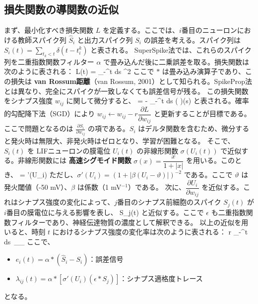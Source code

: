 \subsection{損失関数の導関数の近似}
まず、最小化すべき損失関数 $L$ を定義する。ここでは、$i$番目のニューロンにおける教師スパイク列 $\hat{S}_i$ と出力スパイク列 $S_i$ の誤差を考える。スパイク列は $S_i(t) = \sum_{t_k < t} \delta(t - t_i^k)$ と表される。
SuperSpike法では、これらのスパイク列を二重指数関数フィルター $\alpha$ で畳み込んだ後に二乗誤差を取る。損失関数は次のように表される：
L(t) =  \int_{-\infty}^{t} ds ^2
ここで $*$ は畳み込み演算子であり、この損失は \textbf{van Rossum距離}（van Rossum, 2001）として知られる。SpikeProp法とは異なり、完全にスパイクが一致しなくても誤差信号が残る。
この損失関数をシナプス強度 $w_{ij}$ に関して微分すると、
 = - \int_{-\infty}^{t} ds  \left( \alpha *  \right)(s)
と表される。確率的勾配降下法（SGD）により $w_{ij} \leftarrow w_{ij} - r \dfrac{\partial L}{\partial w_{ij}}$ と更新することが目標である。
ここで問題となるのは $\frac{\partial S_i}{\partial w_{ij}}$ の項である。$S_i$ はデルタ関数を含むため、微分すると発火時は無限大、非発火時はゼロとなり、学習が困難となる。
そこで、$S_i(t)$ を LIFニューロンの膜電位 $U_i(t)$ の非線形関数 $\sigma(U_i(t))$ で近似する。非線形関数には \textbf{高速シグモイド関数} $\sigma(x) = \dfrac{x}{1 + |x|}$ を用いる。このとき、
 \approx {} = \sigma'(U_i) \cdot {}
ただし、$\sigma'(U_i) = (1 + |\beta(U_i - \vartheta)|)^{-2}$ である。ここで $\vartheta$ は発火閾値（-50 mV）、$\beta$ は係数（1 mV$^{-1}$）である。
次に、$\dfrac{\partial U_i}{\partial w_{ij}}$ を近似する。これはシナプス強度の変化によって、$j$番目のシナプス前細胞のスパイク $S_j(t)$ が $i$番目の膜電位に与える影響を表し、
 \approx \epsilon * S_j(t)
と近似する。ここで $\epsilon$ も二重指数関数フィルターであり、神経伝達物質の濃度として解釈できる。
以上の近似を用いると、時刻 $t$ におけるシナプス強度の変化率は次のように表される：
 \approx r \int_{-\infty}^{t} ds\ _{}\cdot{}_{}
ここで、
\begin{itemize}
\item $e_i(t) = \alpha * (\hat{S}_i - S_i)$：誤差信号
\item $\lambda_{ij}(t) = \alpha * [\sigma'(U_i) (\epsilon * S_j)]$：シナプス適格度トレース
\end{itemize}
となる。
